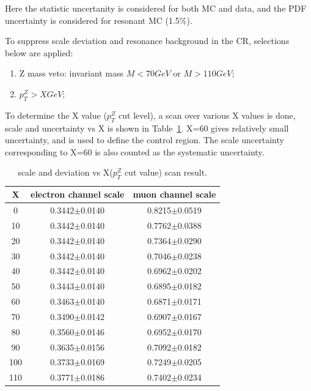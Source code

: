 Here the statistic uncertanity is considered for both MC and data, and the PDF uncertainty is considered for resonant MC (1.5\%).

\vspace{0.3cm}
To suppress scale deviation and resonance background in the CR, selections below are applied: 
\begin{enumerate}
\item Z mass veto: invariant mass $M<70GeV$ or $M>110GeV$; 
\item $p_{T}^{Z} > X GeV$;
\end{enumerate}

To determine the X value ($p_{T}^{Z}$ cut level), a scan over various X values is done, scale and uncertainty vs X is shown in Table~\ref{tab:nonressfdev}. X=60 gives relatively small uncertainty, and is used to define the control region. The scale uncertainty corresponding to X=60 is also counted as the systematic uncertainty.

\begin{table}[htbp]
  \begin{center}
    \caption{
      scale and deviation vs X($p_{T}^{Z}$ cut value) scan result.      
      \label{tab:nonressfdev}}
    \begin{tabular}{c c c}
      \hline\hline
      X & electron channel scale & muon channel scale\\
      \hline
      0  & 0.3442$\pm$0.0140 & 0.8215$\pm$0.0519 \\
      10 & 0.3442$\pm$0.0140 & 0.7762$\pm$0.0388 \\
      20 & 0.3442$\pm$0.0140 & 0.7364$\pm$0.0290 \\
      30 & 0.3442$\pm$0.0140 & 0.7046$\pm$0.0238 \\
      40 & 0.3442$\pm$0.0140 & 0.6962$\pm$0.0202 \\
      50 & 0.3443$\pm$0.0140 & 0.6895$\pm$0.0182 \\
      60 & 0.3463$\pm$0.0140 & 0.6871$\pm$0.0171 \\
      70 & 0.3490$\pm$0.0142 & 0.6907$\pm$0.0167 \\
      80 & 0.3560$\pm$0.0146 & 0.6952$\pm$0.0170 \\
      90 & 0.3635$\pm$0.0156 & 0.7092$\pm$0.0182 \\
      100 & 0.3733$\pm$0.0169 & 0.7249$\pm$0.0205 \\
      110 & 0.3771$\pm$0.0186 & 0.7402$\pm$0.0234 \\
      \hline\hline
    \end{tabular}
  \end{center}
\end{table}

